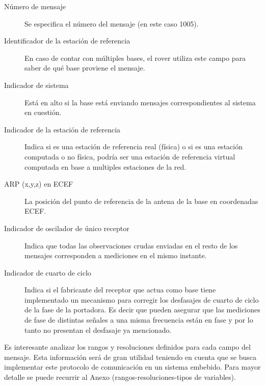 \documentclass[a4paper,12pt,oneside,onecolumn,final,openright]{book}%
\begin{document}

\begin{description}
	\item[Número de mensaje] Se especifica el número del mensaje (en este caso 1005).
	\item[Identificador de la estación de referencia] En caso de contar con múltiples bases, el rover utiliza este campo para saber de qué base proviene el mensaje.
	\item[Indicador de sistema] Está en alto si la base está enviando mensajes correspondientes al sistema en cuestión.
	\item[Indicador de la estación de referencia] Indica si es una estación de referencia real (física) o si es una estación computada o no física, podría ser una estación de referencia virtual computada en base a multiples estaciones de la red.
	\item[ARP (x,y,z) en ECEF] La posición del punto de referencia de la antena de la base en coordenadas ECEF.
	\item [Indicador de oscilador de único receptor] Indica que todas las observaciones crudas enviadas en el resto de los mensajes corresponden a mediciones en el mismo instante.
	\item[Indicador de cuarto de ciclo] Indica si el fabricante del receptor que actua como base tiene implementado un mecanismo para corregir los desfasajes de cuarto de ciclo de la fase de la portadora. Es decir que pueden asegurar que las mediciones de fase de distintas señales a una misma frecuencia están en fase y por lo tanto no presentan el desfasaje ya mencionado.
\end{description}
	
	Es interesante analizar los rangos y resoluciones definidos para cada campo del mensaje. Esta información será de gran utilidad teniendo en cuenta que se busca implementar este protocolo de comunicación en un sistema embebido. Para mayor detalle se puede recurrir al Anexo (rangos-resoluciones-tipos de variables).
	
\end{document}
